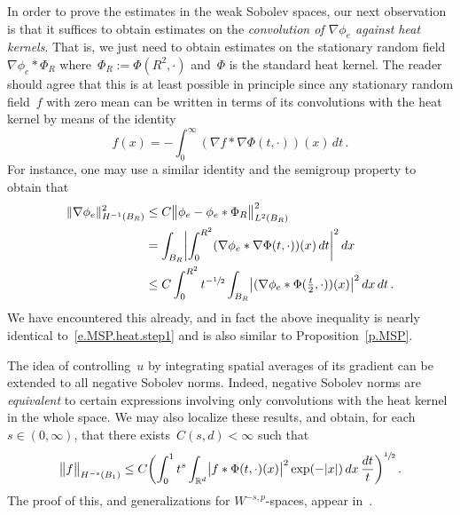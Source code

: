 \documentclass[11pt]{article} %
\numberwithin{equation}{section}
\theoremstyle{definition}
\newcommand*{\Rd}{\ensuremath{\mathbb{R}^d}}
\begin{document}
In order to prove the estimates in the weak Sobolev spaces, our next observation is that it suffices to obtain estimates on the \emph{convolution of $\nabla \phi_e$ against heat kernels}. That is, we just need to obtain estimates on the stationary random field~$\nabla \phi_e \ast \Phi_R$ where~$\Phi_{R} := \Phi(R^2,\cdot)$ and~$\Phi$ is the standard heat kernel. The reader should agree that this is at least possible in principle since any stationary random field~$f$ with zero mean can be written in terms of its convolutions with the heat kernel by means of the identity
\begin{equation*}
f(x) = - \int_0^\infty (\nabla f \ast \nabla \Phi(t,\cdot) ) (x) \,dt\,.
\end{equation*}
For instance, one may use a similar identity and the semigroup property to obtain that
\begin{align}
\label{e.multiscale.HK}
\| \nabla \phi_e \|_{H^{-1}(B_R)}^2 
& 
\leq 
C
\bigl\| \phi_e - \phi_e\ast \Phi_R  \bigr\|_{L^2(B_R)}^2 
\notag \\ & 
= 
\int_{B_R} \biggl| 
\int_0^{R^2} (\nabla \phi_e \ast \nabla \Phi(t,\cdot) ) (x) \,dt
\biggr|^2\,dx
\notag \\ & 
\leq 
C\int_0^{R^2} 
t^{-\sfrac12}
\int_{B_R} 
\bigl| (\nabla \phi_e \ast \Phi(\tfrac t2,\cdot) ) (x) \bigr|^2
\,dx \,dt\,.
\end{align}
We have encountered this already, and in fact the above inequality is nearly identical to~\eqref{e.MSP.heat.step1} and is also similar to Proposition~\ref{p.MSP}. 

\smallskip 

The idea of controlling~$u$ by integrating spatial averages of its gradient can be extended to all negative Sobolev norms. Indeed, negative Sobolev norms are \emph{equivalent} to certain expressions involving only convolutions with the heat kernel in the whole space. We may also localize these results, and obtain, for each~$s\in (0,\infty)$, that there exists~$C(s,d) <\infty$ such that
\begin{equation}
\label{e.negsob.sint}
\big\| f \bigr\|_{H^{-s}(B_1)} 
\leq C
\biggl( 
\int_0^1 t^{s}  \int_{\Rd}  \bigl| f\ast \Phi(t,\cdot) (x) \bigr|^2 \exp(-|x|) \, dx 
\,\frac{dt}{t} 
\biggr)^{\sfrac12}\,.
\end{equation}
The proof of this, 
and generalizations for $W^{-s,p}$-spaces, appear in~\cite[Appendix D]{AKMBook}. 


\smallskip
\end{document}
